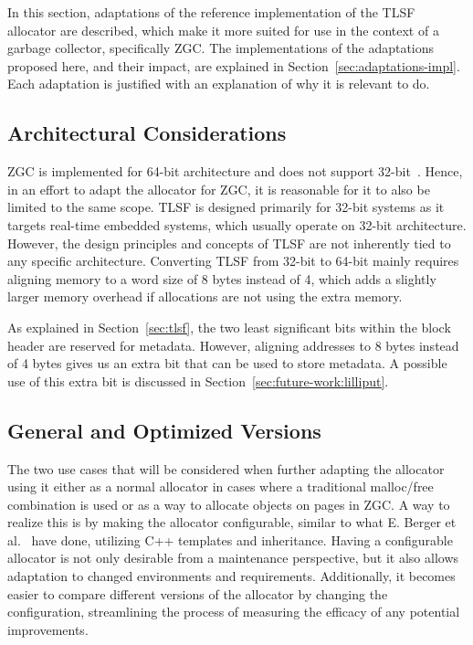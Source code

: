 
In this section, adaptations of the reference implementation of the TLSF allocator are described, which make it more suited for use in the context of a garbage collector, specifically ZGC. The implementations of the adaptations proposed here, and their impact, are explained in Section~\ref{sec:adaptations-impl}. Each adaptation is justified with an explanation of why it is relevant to do.

\subsection{Architectural Considerations}
\label{sec:adaptations:architectural-considerations}

ZGC is implemented for 64-bit architecture and does not support 32-bit~\cite{zgc_deep_dive}. Hence, in an effort to adapt the allocator for ZGC, it is reasonable for it to also be limited to the same scope. TLSF is designed primarily for 32-bit systems as it targets real-time embedded systems, which usually operate on 32-bit architecture. However, the design principles and concepts of TLSF are not inherently tied to any specific architecture. Converting TLSF from 32-bit to 64-bit mainly requires aligning memory to a word size of 8 bytes instead of 4, which adds a slightly larger memory overhead if allocations are not using the extra memory.

As explained in Section~\ref{sec:tlsf}, the two least significant bits within the block header are reserved for metadata. However,  aligning addresses to 8 bytes instead of 4 bytes gives us an extra bit that can be used to store metadata. A possible use of this extra bit is discussed in Section~\ref{sec:future-work:lilliput}.

\subsection{General and Optimized Versions}

The two use cases that will be considered when further adapting the allocator using it either as a normal allocator in cases where a traditional malloc/free combination is used or as a way to allocate objects on pages in ZGC. A way to realize this is by making the allocator configurable, similar to what E. Berger et al.~\cite{configurable_allocator} have done, utilizing C++ templates and inheritance. Having a configurable allocator is not only desirable from a maintenance perspective, but it also allows adaptation to changed environments and requirements. Additionally, it becomes easier to compare different versions of the allocator by changing the configuration, streamlining the process of measuring the efficacy of any potential improvements.

